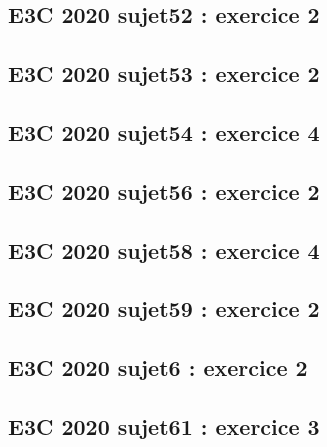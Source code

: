 \documentclass[lang=fr,edition=teacher,layout=sheet]{mxbook}
\begin{document}
\par\bigskip
{}\subsection*{E3C 2020 sujet52 : exercice 2}
\begingroup\endgroup
\par\bigskip
{}\subsection*{E3C 2020 sujet53 : exercice 2}
\begingroup\endgroup
\par\bigskip
{}\subsection*{E3C 2020 sujet54 : exercice 4}
\begingroup\endgroup
\par\bigskip
{}\subsection*{E3C 2020 sujet56 : exercice 2}
\begingroup\endgroup
\par\bigskip
{}\subsection*{E3C 2020 sujet58 : exercice 4}
\begingroup\endgroup
\par\bigskip
{}\subsection*{E3C 2020 sujet59 : exercice 2}
\begingroup\endgroup
\par\bigskip
{}\subsection*{E3C 2020 sujet6 : exercice 2}
\begingroup\endgroup
\par\bigskip
{}\subsection*{E3C 2020 sujet61 : exercice 3}
\end{document}
